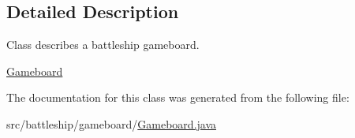 \subsection{Detailed Description}
Class describes a battleship gameboard. 

\hyperlink{classbattleship_1_1gameboard_1_1Gameboard}{Gameboard} 

The documentation for this class was generated from the following file\+:\begin{DoxyCompactItemize}
\item 
src/battleship/gameboard/\hyperlink{Gameboard_8java}{Gameboard.\+java}\end{DoxyCompactItemize}

